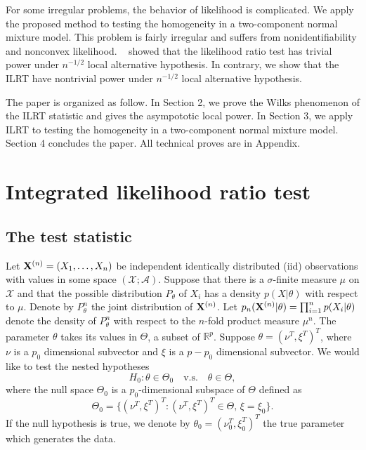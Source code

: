 \documentclass[11pt]{article}
\theoremstyle{plain}
\theoremstyle{definition}
\theoremstyle{remark}
\begin{document}
For some irregular problems, the behavior of likelihood is complicated.
We apply the proposed method to testing the homogeneity in a two-component normal mixture model.
This problem is fairly irregular and suffers from nonidentifiability and nonconvex likelihood.
~\cite{HALL2005158} showed that the likelihood ratio test has trivial power under $n^{-1/2}$ local alternative hypothesis. 
In contrary, we show that the ILRT have nontrivial power under $n^{-1/2}$ local alternative hypothesis.



The paper is organized as follow.
In Section 2, we prove the Wilks phenomenon of the ILRT statistic and gives the asympototic local power.
In Section 3, we apply ILRT to testing the homogeneity in a two-component normal mixture model.
Section 4 concludes the paper.
All technical proves are in Appendix.





\section{Integrated likelihood ratio test}

\subsection{The test statistic}

Let $\mathbf{X}^{(n)}=(X_1,\ldots,X_n)$ be independent identically distributed (iid) observations with values in some space $(\mathcal{X};\mathscr{A})$.
Suppose that there is a $\sigma$-finite measure $\mu$ on $\mathcal{X}$ and that the  possible distribution $P_\theta$ of $X_i$ has a density $p(X|\theta)$ with respect to $\mu$.
Denote by $P_{\theta}^{n}$ the joint distribution of $\mathbf{X}^{(n)}$.
Let $p_{n}(\mathbf{X}^{(n)}|\theta)=\prod_{i=1}^n p(X_i|\theta)$ denote the density of $P_{\theta}^n$ with respect to the $n$-fold product measure $\mu^n$.
The parameter $\theta$ takes its values in $\Theta$, a subset of $\mathbb{R}^{p}$.
Suppose $\theta=(\nu^T,\xi^T)^T$, where $\nu$ is a $p_0$ dimensional subvector and $\xi$ is a $p-p_0$ dimensional subvector.
 We would like to test the nested hypotheses
\begin{equation*}
    H_0:\theta\in\Theta_0\quad \text{v.s.}\quad \theta\in\Theta,
\end{equation*}
where the null space $\Theta_0$ is a $p_0$-dimensional subspace of $\Theta$ defined as
\begin{equation*}
    \Theta_0=\{(\nu^T,\xi^T)^T:(\nu^T,\xi^T)^T\in\Theta, \, \xi=\xi_0\}.
\end{equation*}
If the null hypothesis is true, we denote by $\theta_0=(\nu_0^T,\xi_0^T)^T$ the true parameter which generates the data.
\end{document}
